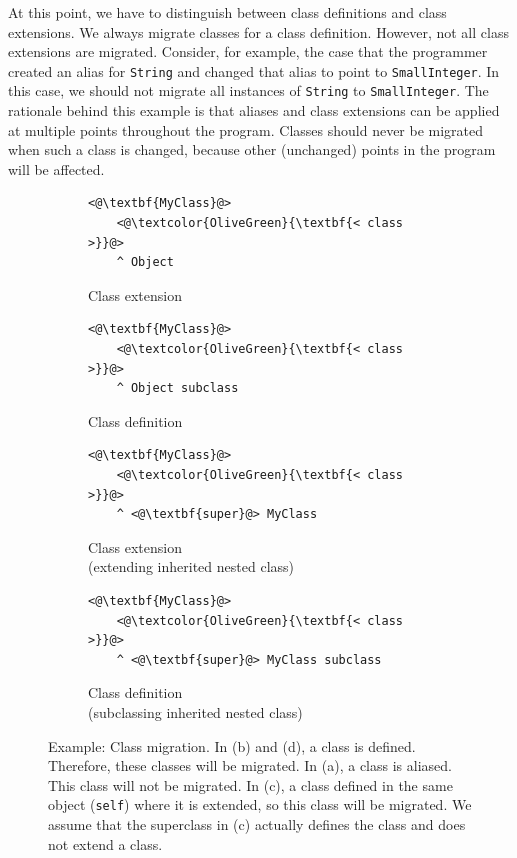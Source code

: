 At this point, we have to distinguish between class definitions and class extensions. We always migrate classes for a class definition. However, not all class extensions are migrated. Consider, for example, the case that the programmer created an alias for \texttt{String} and changed that alias to point to \texttt{SmallInteger}. In this case, we should not migrate all instances of \texttt{String} to \texttt{SmallInteger}. The rationale behind this example is that aliases and class extensions can be applied at multiple points throughout the program. Classes should never be migrated when such a class is changed, because other (unchanged) points in the program will be affected. 

\begin{figure}[!htp]
\centering
\begin{subfigure}[b]{0.45\textwidth}
\begin{lstlisting}
<@\textbf{MyClass}@>
    <@\textcolor{OliveGreen}{\textbf{< class >}}@>
    ^ Object
\end{lstlisting}
\caption{Class extension}
\label{fig:impl_cls_migr_ext}
\end{subfigure}
\qquad
\begin{subfigure}[b]{0.45\textwidth}
\begin{lstlisting}
<@\textbf{MyClass}@>
    <@\textcolor{OliveGreen}{\textbf{< class >}}@>
    ^ Object subclass
\end{lstlisting}
\caption{Class definition}
\label{fig:impl_cls_migr_def}
\end{subfigure}

\vspace{10pt}

\begin{subfigure}[b]{0.45\textwidth}
\begin{lstlisting}
<@\textbf{MyClass}@>
    <@\textcolor{OliveGreen}{\textbf{< class >}}@>
    ^ <@\textbf{super}@> MyClass
\end{lstlisting}
\caption{Class extension \\ (extending inherited nested class)}
\label{fig:impl_cls_migr_ext_nested}
\end{subfigure}
\qquad
\begin{subfigure}[b]{0.45\textwidth}
\begin{lstlisting}
<@\textbf{MyClass}@>
    <@\textcolor{OliveGreen}{\textbf{< class >}}@>
    ^ <@\textbf{super}@> MyClass subclass
\end{lstlisting}
\caption{Class definition \\ (subclassing inherited nested class)}
\label{fig:impl_cls_migr_subclass_nested}
\end{subfigure}
\caption[Example: Class migration]{Example: Class migration. In (b) and (d), a class is defined. Therefore, these classes will be migrated. In (a), a class is aliased. This class will not be migrated. In (c), a class defined in the same object (\texttt{self}) where it is extended, so this class will be migrated. We assume that the superclass in (c) actually defines the class and does not extend a class.}
\label{fig:impl_cls_migration_full}
\end{figure}

